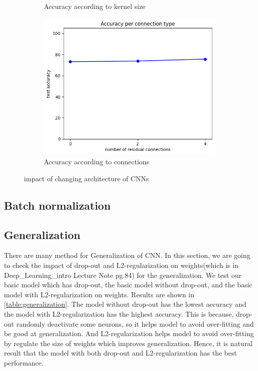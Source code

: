 \begin{figure}[htbp]
\begin{subfigure}[t]{0.3\linewidth}
		\caption{Accuracy according to kernel size}
		\label{fig:q4-2-kernel}
	\end{subfigure}%
    \hfill
	\begin{subfigure}[t]{0.3\linewidth}
		\centering
		\includegraphics[width=\linewidth]{image/q4-2-connection.png}
		\caption{Accuracy according to connections}
		\label{fig:q4-2-connection}
	\end{subfigure}

	\caption{impact of changing architecture of CNNs}
	\label{fig:cnn_architecture}
\end{figure}

\subsection{Batch normalization}

\subsection{Generalization}
There are many method for Generalization of CNN. In this section, we are going to check the impact of drop-out and L2-regularization on weights(which is in Deep\_Learning\_intro Lecture Note pg.84) for the generalization.
We test our basic model which has drop-out, the basic model without drop-out, and the basic model with L2-regularization on weights. Results are shown in \cref{table:generalization}. The model without drop-out has the lowest accuracy and the model with L2-regularization has the highest accuracy. This is because, drop-out randomly deactivate some neurons, so it helps model to avoid over-fitting and be good at generalization. And L2-regularization helps model to avoid over-fitting by regulate the size of weights which improves generalization. Hence, it is natural result that the model with both drop-out and L2-regularization has the best performance.

